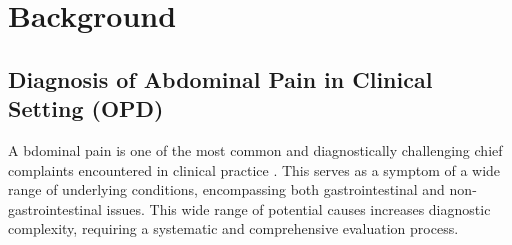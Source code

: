 \section{Background}
\subsection{Diagnosis of Abdominal Pain in Clinical Setting (OPD)}
\label{sec:abdominal_pain}
\lettrine{A}{ }bdominal pain is one of the most common and diagnostically challenging chief complaints encountered in clinical practice \cite{gans2015guideline}. This serves as a symptom of a wide range of underlying conditions, encompassing both gastrointestinal and non-gastrointestinal issues. This wide range of potential causes increases diagnostic complexity, requiring a systematic and comprehensive evaluation process.\\

